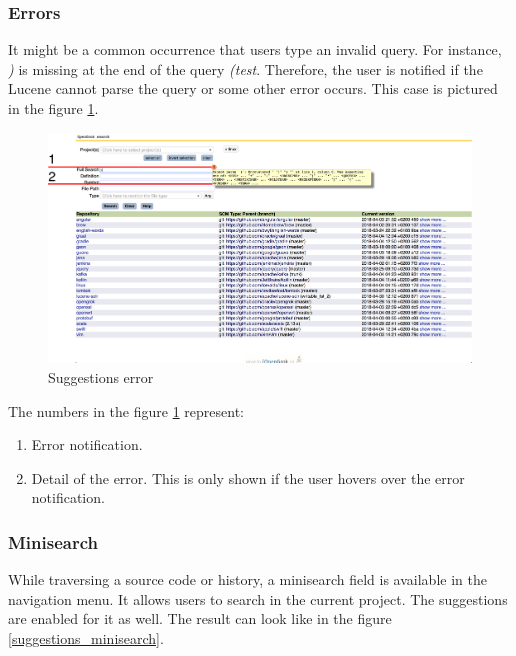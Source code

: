 \subsubsection{Errors}
It might be a common occurrence that users type an invalid query. For instance, \textit{)} is missing at the end of
the query \textit{(test}. Therefore, the user is notified if the Lucene cannot parse the query or some other
error occurs. This case is pictured in the figure \ref{suggestions_error}.

\begin{figure}[htbp]
    \centering
    \includegraphics[width=145mm]{../img/suggestions_error.png}
    \caption{Suggestions error}
    \label{suggestions_error}
\end{figure}

The numbers in the figure \ref{suggestions_error} represent:
\begin{enumerate}
    \item Error notification.
    \item Detail of the error. This is only shown if the user hovers over the error notification.
\end{enumerate}

\subsubsection{Minisearch}
While traversing a source code or history, a minisearch field is available in the navigation menu. It allows users
to search in the current project. The suggestions are enabled for it as well. The result can look like in the figure
\ref{suggestions_minisearch}.

